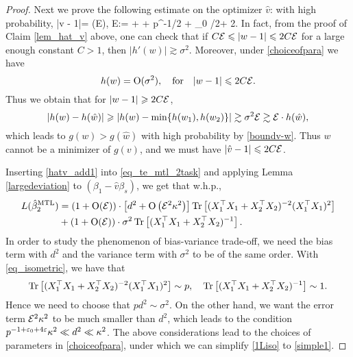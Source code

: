 \begin{proof}
Next we prove the following estimate on the optimizer $\hat v$: with high probability,
\be\label{hatv_add1}
|\hat v - 1|= \OO\left(\cal E\right), \quad \cal E:= +  + p^{-1/2 + \e_0 /2+ 2\e}.
\ee
 In fact, from the proof of Claim \ref{lem_hat_v} above, one can check that if $C\cal E \le |w-1| \le 2C\cal E$ for a large enough constant $C>1$, then $|h'(w)|\gtrsim \sigma^2$. Moreover, under \eqref{choiceofpara} we have
$$h(w) =\OO(\sigma^2),\quad \text{for}\quad   |w-1|\le 2C\cal E.$$
Thus we obtain that for $|w-1|\ge 2C\cal E$,
$$\left|h(w) - h(\hat w)\right|\ge |h(w)-\min\{h(w_1),h(w_2)\}|\gtrsim \sigma^2 \cal E \gtrsim \cal E \cdot h(\hat w),$$
which leads to $g(w) > g(\hat w)$ with high probability by \eqref{boundv-w}. Thus $w$ cannot be a minimizer of $g(v)$, and we must have $|\hat v - 1|\le 2C\cal E$. %

Inserting \eqref{hatv_add1} into \eqref{eq_te_mtl_2task} and applying Lemma  \ref{largedeviation} to $(\beta_1-\hat v\beta_s)$, we get that w.h.p.,
\begin{align}
\te(\hat{\beta}_2^{\MTL})&=(1+\OO(\cal E))\cdot \left[d^2 + \OO\left(\cal E^2 \kappa^2\right)\right] \tr\left[(X_1^{\top}X_1 +X_2^{\top}X_2)^{-2} (X_1^{\top}X_1)^2\right]\nonumber\\
&+(1+\OO(\cal E))\cdot \sigma^2  \bigtr{(X_1^{\top}X_1  + X_2^{\top}X_2)^{-1} }. \label{1Liso}
\end{align}
In order to study the phenomenon of bias-variance trade-off, we need the bias term with $d^2$ and the variance term with $\sigma^2$ to be of the same order. With \eqref{eq_isometric}, we have that
$$\tr\left[(X_1^{\top}X_1 +X_2^{\top}X_2)^{-2} (X_1^{\top}X_1)^2\right] \sim p,\quad \bigtr{(X_1^{\top}X_1  + X_2^{\top}X_2)^{-1} } \sim 1.$$
Hence we need to choose that $p d^2 \sim \sigma^2$. On the other hand, we want the error term $\cal E^2 \kappa^2$ to be much smaller than $d^2$, which leads to the condition $p^{-1+\e_0+4\e}\kappa^2  \ll d^2 \ll \kappa^2$. The above considerations lead to the choices of parameters in \eqref{choiceofpara}, under which we can simplify \eqref{1Liso} to \eqref{simple1}.
\end{proof}

